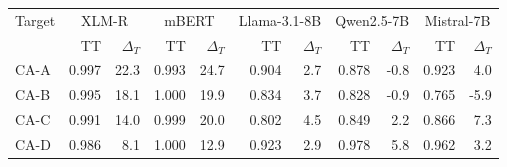 \begin{tabular}{lrrrrrrrrrr}
\toprule
Target & \multicolumn{2}{c}{XLM-R} & \multicolumn{2}{c}{mBERT} & \multicolumn{2}{c}{Llama-3.1-8B} & \multicolumn{2}{c}{Qwen2.5-7B} & \multicolumn{2}{c}{Mistral-7B} \\
 & TT & $\Delta_T$ & TT & $\Delta_T$ & TT & $\Delta_T$ & TT & $\Delta_T$ & TT & $\Delta_T$ \\
\midrule
CA-A & 0.997 & 22.3 & 0.993 & 24.7 & 0.904 & 2.7 & 0.878 & -0.8 & 0.923 & 4.0 \\
CA-B & 0.995 & 18.1 & 1.000 & 19.9 & 0.834 & 3.7 & 0.828 & -0.9 & 0.765 & -5.9 \\
CA-C & 0.991 & 14.0 & 0.999 & 20.0 & 0.802 & 4.5 & 0.849 & 2.2 & 0.866 & 7.3 \\
CA-D & 0.986 & 8.1 & 1.000 & 12.9 & 0.923 & 2.9 & 0.978 & 5.8 & 0.962 & 3.2 \\
\bottomrule
\end{tabular}
